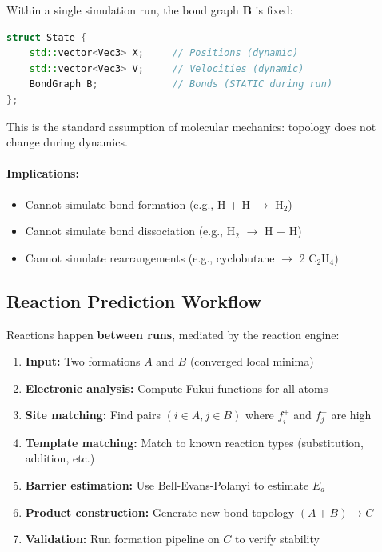 \documentclass[11pt]{article}
\begin{document}
Within a single simulation run, the bond graph $\mathbf{B}$ is fixed:

\begin{lstlisting}[language=C++]
struct State {
    std::vector<Vec3> X;     // Positions (dynamic)
    std::vector<Vec3> V;     // Velocities (dynamic)
    BondGraph B;             // Bonds (STATIC during run)
};
\end{lstlisting}

This is the standard assumption of molecular mechanics: topology does not change during dynamics.

\paragraph{Implications:}
\begin{itemize}
\item Cannot simulate bond formation (e.g., H + H $\to$ H$_2$)
\item Cannot simulate bond dissociation (e.g., H$_2$ $\to$ H + H)
\item Cannot simulate rearrangements (e.g., cyclobutane $\to$ 2 C$_2$H$_4$)
\end{itemize}

\subsection{Reaction Prediction Workflow}

Reactions happen \textbf{between runs}, mediated by the reaction engine:

\begin{enumerate}
\item \textbf{Input:} Two formations $A$ and $B$ (converged local minima)
\item \textbf{Electronic analysis:} Compute Fukui functions for all atoms
\item \textbf{Site matching:} Find pairs $(i \in A, j \in B)$ where $f_i^+$ and $f_j^-$ are high
\item \textbf{Template matching:} Match to known reaction types (substitution, addition, etc.)
\item \textbf{Barrier estimation:} Use Bell-Evans-Polanyi to estimate $E_a$
\item \textbf{Product construction:} Generate new bond topology $(A + B) \to C$
\item \textbf{Validation:} Run formation pipeline on $C$ to verify stability
\end{enumerate}
\end{document}

